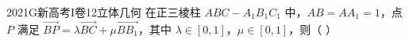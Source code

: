 
\begin{problem}{2021}{G}{新高考I卷}{12}{立体几何}
在正三棱柱 $ ABC-A_1B_1C_1 $ 中，$ AB=AA_1=1 $，点 $ P $ 满足 $ \overrightarrow{BP}=\lambda\overrightarrow{BC}+\mu\overrightarrow{BB_1} $，其中 $ \lambda\in[0,1] $，$ \mu\in[0,1] $，则（ ）
\begin{choices}
\end{choices}
\end{problem}

\begin{answer}

\end{answer}

\begin{solutions}

\end{solutions}